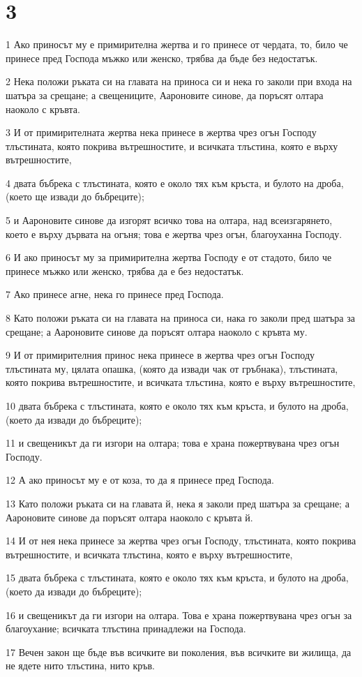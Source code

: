 \chapter{3}

\par 1 Ако приносът му е примирителна жертва и го принесе от чердата, то, било че принесе пред Господа мъжко или женско, трябва да бъде без недостатък.
\par 2 Нека положи ръката си на главата на приноса си и нека го заколи при входа на шатъра за срещане; а свещениците, Аароновите синове, да поръсят олтара наоколо с кръвта.
\par 3 И от примирителната жертва нека принесе в жертва чрез огън Господу тлъстината, която покрива вътрешностите, и всичката тлъстина, която е върху вътрешностите,
\par 4 двата бъбрека с тлъстината, която е около тях към кръста, и булото на дроба, (което ще извади до бъбреците);
\par 5 и Аароновите синове да изгорят всичко това на олтара, над всеизгарянето, което е върху дървата на огъня; това е жертва чрез огън, благоуханна Господу.
\par 6 И ако приносът му за примирителна жертва Господу е от стадото, било че принесе мъжко или женско, трябва да е без недостатък.
\par 7 Ако принесе агне, нека го принесе пред Господа.
\par 8 Като положи ръката си на главата на приноса си, нака го заколи пред шатъра за срещане; а Аароновите синове да поръсят олтара наоколо с кръвта му.
\par 9 И от примирителния принос нека принесе в жертва чрез огън Господу тлъстината му, цялата опашка, (която да извади чак от гръбнака), тлъстината, която покрива вътрешностите, и всичката тлъстина, която е върху вътрешностите,
\par 10 двата бъбрека с тлъстината, която е около тях към кръста, и булото на дроба, (което да извади до бъбреците);
\par 11 и свещеникът да ги изгори на олтара; това е храна пожертвувана чрез огън Господу.
\par 12 А ако приносът му е от коза, то да я принесе пред Господа.
\par 13 Като положи ръката си на главата й, нека я заколи пред шатъра за срещане; а Аароновите синове да поръсят олтара наоколо с кръвта й.
\par 14 И от нея нека принесе за жертва чрез огън Господу, тлъстината, която покрива вътрешностите, и всичката тлъстина, която е върху вътрешностите,
\par 15 двата бъбрека с тлъстината, която е около тях към кръста, и булото на дроба, (което да извади до бъбреците);
\par 16 и свещеникът да ги изгори на олтара. Това е храна пожертвувана чрез огън за благоухание; всичката тлъстина принадлежи на Господа.
\par 17 Вечен закон ще бъде във всичките ви поколения, във всичките ви жилища, да не ядете нито тлъстина, нито кръв.

